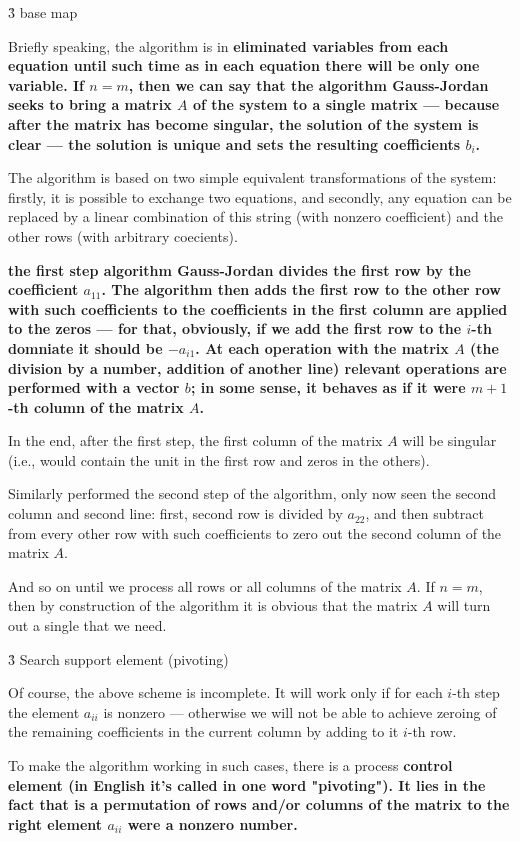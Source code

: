 \h3{ base map }

Briefly speaking, the algorithm is in \bf{eliminated} variables from each equation until such time as in each equation there will be only one variable. If $n=m$, then we can say that the algorithm Gauss-Jordan seeks to bring a matrix $A$ of the system to a single matrix --- because after the matrix has become singular, the solution of the system is clear --- the solution is unique and sets the resulting coefficients $b_i$.

The algorithm is based on two simple equivalent transformations of the system: firstly, it is possible to exchange two equations, and secondly, any equation can be replaced by a linear combination of this string (with nonzero coefficient) and the other rows (with arbitrary coecients).

\bf{the first step} algorithm Gauss-Jordan divides the first row by the coefficient $a_{11}$. The algorithm then adds the first row to the other row with such coefficients to the coefficients in the first column are applied to the zeros --- for that, obviously, if we add the first row to the $i$-th domniate it should be $-a_{i1}$. At each operation with the matrix $A$ (the division by a number, addition of another line) relevant operations are performed with a vector $b$; in some sense, it behaves as if it were $m+1$-th column of the matrix $A$.

In the end, after the first step, the first column of the matrix $A$ will be singular (i.e., would contain the unit in the first row and zeros in the others).

Similarly performed the second step of the algorithm, only now seen the second column and second line: first, second row is divided by $a_{22}$, and then subtract from every other row with such coefficients to zero out the second column of the matrix $A$.

And so on until we process all rows or all columns of the matrix $A$. If $n=m$, then by construction of the algorithm it is obvious that the matrix $A$ will turn out a single that we need.


\h3{ Search support element (pivoting) }

Of course, the above scheme is incomplete. It will work only if for each $i$-th step the element $a_{ii}$ is nonzero --- otherwise we will not be able to achieve zeroing of the remaining coefficients in the current column by adding to it $i$-th row.

To make the algorithm working in such cases, there is a process \bf{control element} (in English it's called in one word "pivoting"). It lies in the fact that is a permutation of rows and/or columns of the matrix to the right element $a_{ii}$ were a nonzero number.

